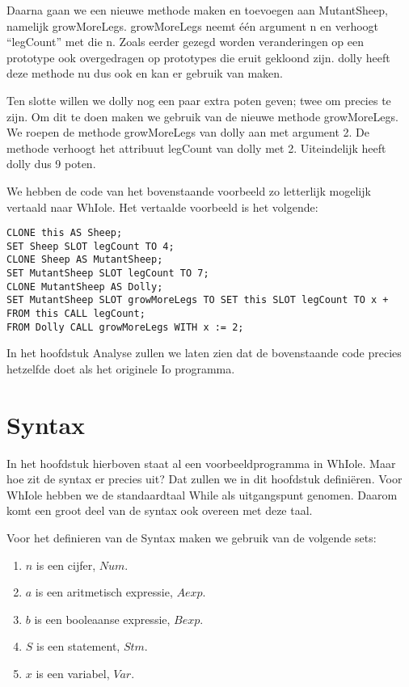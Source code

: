 \documentclass[12pt]{article}
\begin{document}
Daarna gaan we een nieuwe methode maken en toevoegen aan MutantSheep, namelijk growMoreLegs.
growMoreLegs neemt één argument n en verhoogt ``legCount'' met die n. 
Zoals eerder gezegd worden veranderingen op een prototype ook overgedragen op prototypes die eruit gekloond zijn. dolly heeft deze methode nu dus ook en kan er gebruik van maken.\newline

Ten slotte willen we dolly nog een paar extra poten geven; twee om precies te zijn.
Om dit te doen maken we gebruik van de nieuwe methode growMoreLegs.
We roepen de methode growMoreLegs van dolly aan met argument 2.
De methode verhoogt het attribuut legCount van dolly met 2.
Uiteindelijk heeft dolly dus 9 poten.

We hebben de code van het bovenstaande voorbeeld zo letterlijk mogelijk vertaald naar WhIole.
Het vertaalde voorbeeld is het volgende:
\begin{lstlisting}[frame=single]
CLONE this AS Sheep;
SET Sheep SLOT legCount TO 4;
CLONE Sheep AS MutantSheep;
SET MutantSheep SLOT legCount TO 7;
CLONE MutantSheep AS Dolly;
SET MutantSheep SLOT growMoreLegs TO SET this SLOT legCount TO x + FROM this CALL legCount;
FROM Dolly CALL growMoreLegs WITH x := 2;
\end{lstlisting}
In het hoofdstuk Analyse zullen we laten zien dat de bovenstaande code precies hetzelfde doet als het originele Io programma.

\pagebreak
\section{Syntax}
In het hoofdstuk hierboven staat al een voorbeeldprogramma in WhIole. Maar hoe zit de syntax er precies uit? Dat zullen we in dit hoofdstuk definiëren. Voor WhIole hebben we de standaardtaal While als uitgangspunt genomen. Daarom komt een groot deel van de syntax ook overeen met deze taal.

Voor het definieren van de Syntax maken we gebruik van de volgende sets: 
\begin{enumerate}[noitemsep]
	\item[] $n$ is een cijfer, $Num$.
	\item[] $a$ is een aritmetisch expressie, $Aexp$.
	\item[] $b$ is een booleaanse expressie, $Bexp$. 
	\item[] $S$ is een statement, $Stm$. 
	\item[] $x$ is een variabel, $Var$. 
\end{enumerate}	 
\end{document}
